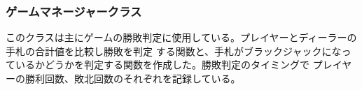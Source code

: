 \subsubsection{ゲームマネージャークラス}
このクラスは主にゲームの勝敗判定に使用している。プレイヤーとディーラーの手札の合計値を比較し勝敗を判定
する関数と、手札がブラックジャックになっているかどうかを判定する関数を作成した。勝敗判定のタイミングで
プレイヤーの勝利回数、敗北回数のそれぞれを記録している。%

